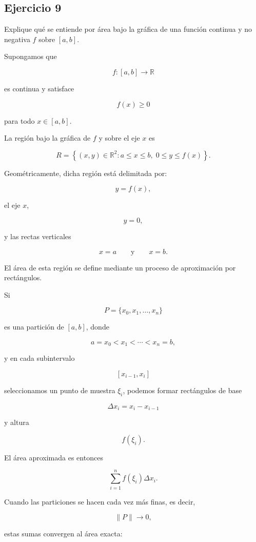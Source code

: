 \documentclass[12pt]{article}
\begin{document}
\subsection*{Ejercicio 9}

Explique qué se entiende por área bajo la gráfica de una función
continua y no negativa \(f\) sobre \([a,b]\).

Supongamos que

\[
f:[a,b]\longrightarrow\mathbb{R}
\]

es continua y satisface

\[
f(x)\geq 0
\]

para todo \(x\in[a,b]\).

La región bajo la gráfica de \(f\) y sobre el eje \(x\) es

\[
R=
\left\{
(x,y)\in\mathbb{R}^2:
a\leq x\leq b,\;
0\leq y\leq f(x)
\right\}.
\]

Geométricamente, dicha región está delimitada por:

\[
y=f(x),
\]

el eje \(x\),

\[
y=0,
\]

y las rectas verticales

\[
x=a
\qquad\text{y}\qquad
x=b.
\]

El área de esta región se define mediante un proceso de aproximación por
rectángulos.

Si

\[
P=\{x_0,x_1,\ldots,x_n\}
\]

es una partición de \([a,b]\), donde

\[
a=x_0<x_1<\cdots<x_n=b,
\]

y en cada subintervalo

\[
[x_{i-1},x_i]
\]

seleccionamos un punto de muestra \(\xi_i\), podemos formar rectángulos
de base

\[
\Delta x_i=x_i-x_{i-1}
\]

y altura

\[
f(\xi_i).
\]

El área aproximada es entonces

\[
\sum_{i=1}^{n}f(\xi_i)\Delta x_i.
\]

Cuando las particiones se hacen cada vez más finas, es decir,

\[
\|P\|\longrightarrow 0,
\]

estas sumas convergen al área exacta:
\end{document}
